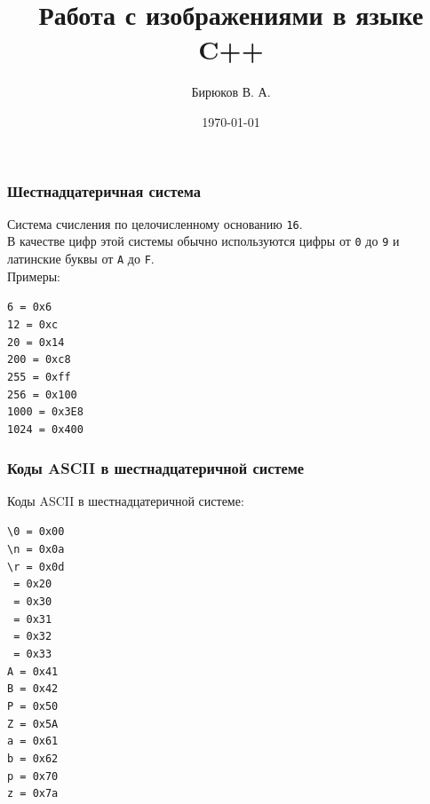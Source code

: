 \documentclass[10pt,pdf,hyperref={unicode}]{beamer}
\title{Работа с изображениями в языке C++}
\author{Бирюков В. А.}
\date{\today}
\newcommand\upquote[1]{\textquotesingle#1\textquotesingle}
\begin{document}
\begin{frame}
\titlepage
\end{frame} 


\begin{frame}[fragile]
\frametitle{Шестнадцатеричная система} 
Система счисления по целочисленному основанию \texttt{16}. \\ 
В качестве цифр этой системы обычно используются цифры от \texttt{0} до \texttt{9} и латинские буквы от \texttt{A} до \texttt{F}.\\
Примеры:\\
\begin{multicols}{2}
\texttt{6 =  0x6} \\
\texttt{12 = 0xc} \\
\texttt{20 = 0x14} \\
\texttt{200 = 0xc8} \\
\texttt{255 = 0xff} \\
\texttt{256 = 0x100} \\
\texttt{1000 = 0x3E8} \\
\texttt{1024 = 0x400} \\
\end{multicols}
\end{frame}


\begin{frame}[fragile]
\frametitle{Коды ASCII в шестнадцатеричной системе} 
Коды ASCII в шестнадцатеричной системе:\\
\begin{multicols}{4}
\texttt{\upquote{\textbackslash 0} =  0x00} \\
\texttt{\upquote{\textbackslash n} =  0x0a} \\
\texttt{\upquote{\textbackslash r} = 0x0d} \\
\texttt{\upquote{ } = 0x20} \\
\texttt{\upquote{0} = 0x30} \\
\texttt{\upquote{1} = 0x31} \\
\texttt{\upquote{2} = 0x32} \\
\texttt{\upquote{3} = 0x33} \\
\texttt{\upquote{A} = 0x41} \\
\texttt{\upquote{B} = 0x42} \\
\texttt{\upquote{P} = 0x50} \\
\texttt{\upquote{Z} = 0x5A} \\
\texttt{\upquote{a} = 0x61} \\
\texttt{\upquote{b} = 0x62} \\
\texttt{\upquote{p} = 0x70} \\
\texttt{\upquote{z} = 0x7a} \\
\end{multicols}
\end{frame}
\end{document}
